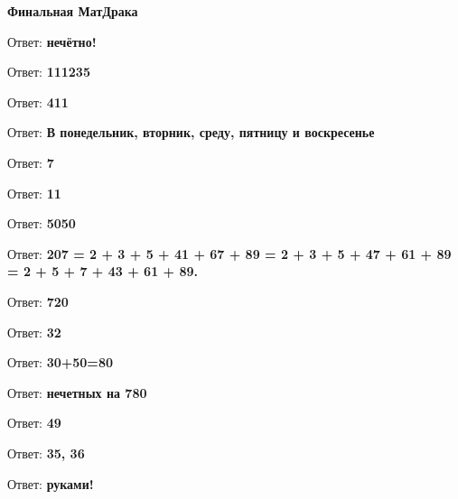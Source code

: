 \centerline{\bf \Huge Финальная МатДрака}

Ответ: \textbf{нечётно!}

Ответ: \textbf{111235}

Ответ: \textbf{411}

Ответ: \textbf{В понедельник, вторник, среду, пятницу и воскресенье}

Ответ: \textbf{7}

Ответ: \textbf{11}

Ответ: \textbf{5050}

Ответ: \textbf{207 = 2 + 3 + 5 + 41 + 67 + 89 = 2 + 3 + 5 + 47 + 61 + 89 = 2 + 5 + 7 + 43 + 61 + 89.}

Ответ: \textbf{720}

Ответ: \textbf{32}

Ответ: \textbf{30+50=80}

Ответ: \textbf{нечетных на 780}

Ответ: \textbf{49}

Ответ: \textbf{35, 36}

Ответ: \textbf{руками!}